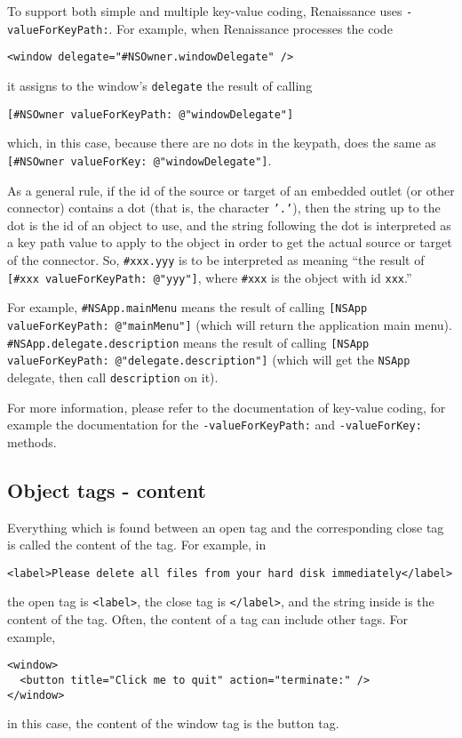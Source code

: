 To support both simple and multiple key-value coding, Renaissance uses
\texttt{-valueForKeyPath:}.  For example, when Renaissance processes the 
code
\begin{verbatim}
<window delegate="#NSOwner.windowDelegate" />
\end{verbatim}
it assigns to the window's \texttt{delegate} the result of calling
\begin{verbatim}
[#NSOwner valueForKeyPath: @"windowDelegate"]
\end{verbatim}
which, in this case, because there are no dots in the keypath, does
the same as \texttt{[\#NSOwner valueForKey: @"windowDelegate"]}.

As a general rule, if the id of the source or target of an embedded
outlet (or other connector) contains a dot (that is, the character
\texttt{'.'}), then the string up to the dot is the id of an object to
use, and the string following the dot is interpreted as a key path
value to apply to the object in order to get the actual source or
target of the connector.  So, \texttt{\#xxx.yyy} is to be interpreted
as meaning ``the result of \texttt{[\#xxx valueForKeyPath: @"yyy"]},
where \texttt{\#xxx} is the object with id \texttt{xxx}.''

For example, \texttt{\#NSApp.mainMenu} means the result of calling
\texttt{[NSApp valueForKeyPath: @"mainMenu"]} (which will return
the application main menu).  \texttt{\#NSApp.delegate.description}
means the result of calling \texttt{[NSApp valueForKeyPath:
@"delegate.description"]} (which will get the \texttt{NSApp} delegate,
then call \texttt{description} on it).

For more information, please refer to the documentation of key-value
coding, for example the documentation for the
\texttt{-valueForKeyPath:} and \texttt{-valueForKey:} methods.

\subsection{Object tags - content}
Everything which is found between an open tag and the corresponding
close tag is called the content of the tag.  For example, in
\begin{verbatim}
<label>Please delete all files from your hard disk immediately</label>
\end{verbatim}
the open tag is \texttt{<label>}, the close tag is \texttt{</label>},
and the string inside is the content of the tag.  Often, the content
of a tag can include other tags.  For example,
\begin{verbatim}
<window>
  <button title="Click me to quit" action="terminate:" />
</window>
\end{verbatim}
in this case, the content of the window tag is the button tag.

